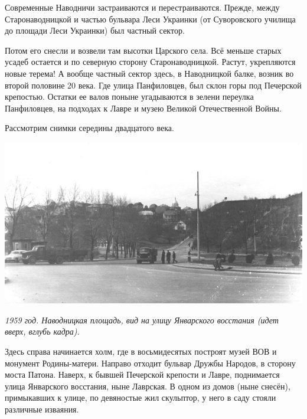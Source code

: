 


Современные Наводничи застраиваются и перестраиваются. Прежде, между Старонаводницкой и частью бульвара Леси Украинки (от Суворовского училища до площади Леси Украинки) был частный сектор.

Потом его снесли и возвели там высотки Царского села. Всё меньше старых усадеб остается и по северную сторону Старонаводницкой. Растут, укрепляются новые терема! А вообще частный сектор здесь, в Наводницкой балке, возник во второй половине 20 века. Где улица Панфиловцев, был склон горы под Печерской крепостью. Остатки ее валов поныне угадываются в зелени переулка Панфиловцев, на подходах к Лавре и музею Великой Отечественной Войны.

Рассмотрим снимки середины двадцатого века.

\begin{center}
\includegraphics[width=\linewidth]{chast-vosp/zver/1959-navodnic-01.jpg}

\textit{1959 год. Наводницкая площадь, вид на улицу Январского восстания (идет вверх, вглубь кадра).}
\end{center}

Здесь справа начинается холм, где в восьмидесятых построят музей ВОВ и монумент Родины-матери. Направо отходит бульвар Дружбы Народов, в сторону моста Патона. Наверх, к бывшей Печерской крепости и Лавре, поднимается улица Январского восстания, ныне Лаврская. В одном из домов (ныне снесён), примыкавших к улице, по девяностые жил скульптор, у него в саду стояли различные изваяния.

